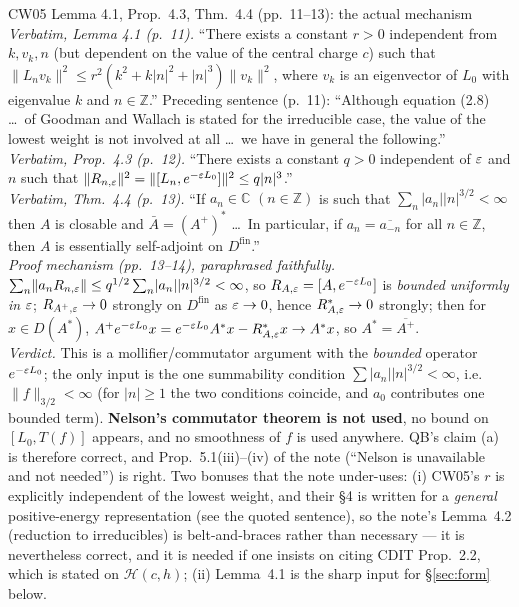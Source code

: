 \documentclass[11pt]{article}
\newcommand{\Hil}{\mathcal H}
\newcommand{\nrm}[1]{\lVert #1\rVert}
\newcommand{\abz}[1]{\lvert #1\rvert}
\begin{document}
\begin{citedbox}{CW05 Lemma 4.1, Prop.~4.3, Thm.~4.4 (pp.~11--13): the actual mechanism}
\emph{Verbatim, Lemma 4.1 (p.~11).}  ``There exists a constant $r>0$ independent from $k,v_k,n$ (but dependent
on the value of the central charge $c$) such that $\nrm{L_nv_k}^2\le r^2(k^2+k\abz n^2+\abz n^3)\nrm{v_k}^2$,
where $v_k$ is an eigenvector of $L_0$ with eigenvalue $k$ and $n\in\mathbb Z$.''  Preceding sentence (p.~11):
``Although equation (2.8) \dots\ of Goodman and Wallach is stated for the irreducible case, the value of the
lowest weight is not involved at all \dots\ we have in general the following.''
\\
\emph{Verbatim, Prop.~4.3 (p.~12).}  ``There exists a constant $q>0$ independent of $\varepsilon$ and $n$ such that
$\nrm{R_{n,\eps}}^2=\nrm{[L_n,e^{-\eps L_0}]}^2\le q\abz n^3$.''
\\
\emph{Verbatim, Thm.~4.4 (p.~13).}  ``If $a_n\in\mathbb C$ $(n\in\mathbb Z)$ is such that
$\sum_n\abz{a_n}\abz n^{3/2}<\infty$ then $A$ is closable and $\bar A=(A^+)^*$ \dots\ In particular, if
$a_n=\overline{a_{-n}}$ for all $n\in\mathbb Z$, then $A$ is essentially self-adjoint on $D^{\mathrm{fin}}$.''
\\
\emph{Proof mechanism (pp.~13--14), paraphrased faithfully.}  $\sum_n\nrm{a_nR_{n,\eps}}\le
q^{1/2}\sum_n\abz{a_n}\abz n^{3/2}<\infty$, so $R_{A,\varepsilon}=[A,e^{-\varepsilon L_0}]$ is \emph{bounded uniformly in
$\varepsilon$}; $R_{A^+,\varepsilon}\to0$ strongly on $D^{\mathrm{fin}}$ as $\varepsilon\to0$, hence $R^*_{A,\varepsilon}\to0$ strongly; then
for $x\in D(A^*)$, $A^+e^{-\varepsilon L_0}x=e^{-\varepsilon L_0}A^*x-R^*_{A,\varepsilon}x\to A^*x$, so $A^*=\overline{A^+}$.
\\
\emph{Verdict.}  This is a mollifier/commutator argument with the \emph{bounded} operator $e^{-\varepsilon L_0}$; the
only input is the one summability condition $\sum\abz{a_n}\abz n^{3/2}<\infty$, i.e.\ $\nrm f_{3/2}<\infty$
(for $\abz n\ge1$ the two conditions coincide, and $a_0$ contributes one bounded term).  \textbf{Nelson's
commutator theorem is not used}, no bound on $[L_0,T(f)]$ appears, and no smoothness of $f$ is used anywhere.
QB's claim (a) is therefore correct, and Prop.~5.1(iii)--(iv) of the note (``Nelson is unavailable and not
needed'') is right.  Two bonuses that the note under-uses: (i) CW05's $r$ is explicitly independent of the
lowest weight, and their \S4 is written for a \emph{general} positive-energy representation (see the quoted
sentence), so the note's Lemma~4.2 (reduction to irreducibles) is belt-and-braces rather than necessary ---
it is nevertheless correct, and it is needed if one insists on citing CDIT Prop.~2.2, which is stated on
$\Hil(c,h)$; (ii) Lemma~4.1 is the sharp input for \S\ref{sec:form} below.
\end{citedbox}
\end{document}
